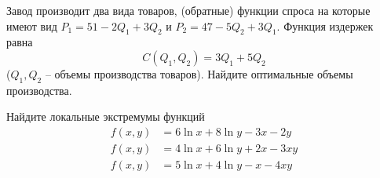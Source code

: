 \begin{exercise}
Завод производит два вида товаров, (обратные) функции спроса на которые
имеют вид $P_1=51-2Q_1+3Q_2$ и $P_2=47-5Q_2+3Q_1$. Функция
издержек равна
\[
	C(Q_1,Q_2)=3Q_1+5Q_2
\]
($Q_1, Q_2$ -- объемы производства товаров). Найдите оптимальные объемы производства. 
\end{exercise}

\begin{exercise}
Найдите локальные экстремумы функций
\begin{align*}
	f(x,y) &= 6\ln x+8\ln y-3x-2y \\
	f(x,y) &= 4\ln x+6\ln y+2x-3xy \\
	f(x,y) &= 5\ln x+4\ln y-x-4xy
\end{align*}
\end{exercise}